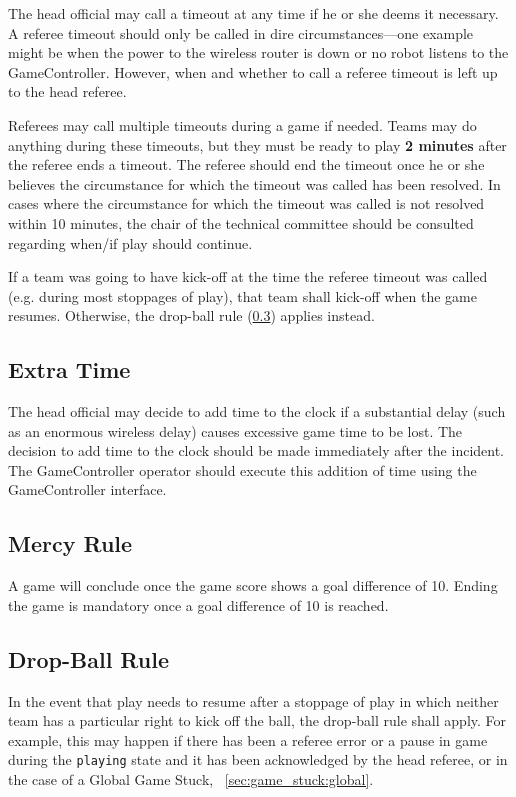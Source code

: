 The head official may call a timeout at any time if he or she deems it necessary.
A referee timeout should only be called in dire circumstances---one example might be when the power to the wireless router is down or no robot listens to the GameController.
However, when and whether to call a referee timeout is left up to the head referee.

Referees may call multiple timeouts during a game if needed.
Teams may do anything during these timeouts, but they must be ready to play \textbf{2 minutes} after the referee ends a timeout.
The referee should end the timeout once he or she believes the circumstance for which the timeout was called has been resolved.
In cases where the circumstance for which the timeout was called is not resolved within 10 minutes, the chair of the technical committee should be consulted regarding when/if play should continue.

If a team was going to have kick-off at the time the referee timeout was called
(e.g. during most stoppages of play), that team shall kick-off when the game resumes.
Otherwise, the drop-ball rule (\cref{sec:drop_ball_rule}) applies instead.

\subsection{Extra Time}
\label{sec:extra_time}

The head official may decide to add time to the clock if a substantial delay (such as an enormous wireless delay) causes excessive game time to be lost.
The decision to add time to the clock should be made immediately after the incident.
The GameController operator should execute this addition of time using the GameController interface.

\subsection{Mercy Rule}
\label{sec:mercy_rule}

A game will conclude once the game score shows a goal difference of 10.
Ending the game is mandatory once a goal difference of 10 is reached.

\subsection{Drop-Ball Rule}
\label{sec:drop_ball_rule}

In the event that play needs to resume after a stoppage of play in which neither
team has a particular right to kick off the ball, the drop-ball rule shall apply.
For example, this may happen if there has been a referee error or a pause in game
during the \texttt{playing} state and it has been acknowledged by the head referee,
or in the case of a Global Game Stuck, \cf~\cref{sec:game_stuck:global}.

